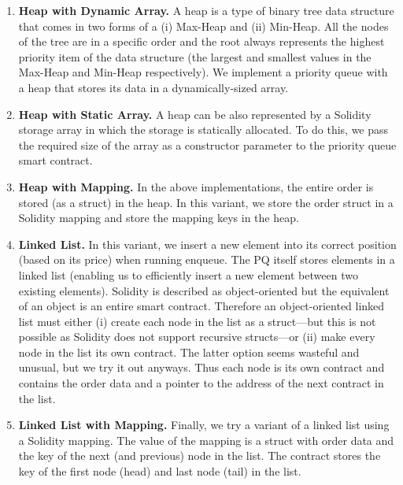 \begin{enumerate}

\item \textbf{Heap with Dynamic Array.} A heap is a type of binary tree data structure that comes in two forms of a (i) Max-Heap and (ii) Min-Heap. All the nodes of the tree are in a specific order and the root always represents the highest priority item of the data structure (the largest and smallest values in the Max-Heap and Min-Heap respectively). We implement a priority queue with a heap that stores its data in a dynamically-sized array. 

\item \textbf{Heap with Static Array.} A heap can be also represented by a Solidity storage array in which the storage is statically allocated. To do this, we pass the required size of the array as a constructor parameter to the priority queue smart contract. 

\item \textbf{Heap with Mapping.} In the above implementations, the entire order is stored (as a struct) in the heap. In this variant, we store the order struct in a Solidity mapping and store the mapping keys in the heap.  

\item \textbf{Linked List.} In this variant, we insert a new element into its correct position (based on its price) when running enqueue. The PQ itself stores elements in a linked list (enabling us to efficiently insert a new element between two existing elements). Solidity is described as object-oriented but the equivalent of an object is an entire smart contract. Therefore an object-oriented linked list must either (i) create each node in the list as a struct---but this is not possible as Solidity does not support recursive structs---or (ii) make every node in the list its own contract. The latter option seems wasteful and unusual, but we try it out anyways. Thus each node is its own contract and contains the order data and a pointer to the address of the next contract in the list.

\item \textbf{Linked List with Mapping.} Finally, we try a variant of a linked list using a Solidity mapping. The value of the mapping is a struct with order data and the key of the next (and previous) node in the list. The contract stores the key of the first node (head) and last node (tail) in the list. 

\end{enumerate}

